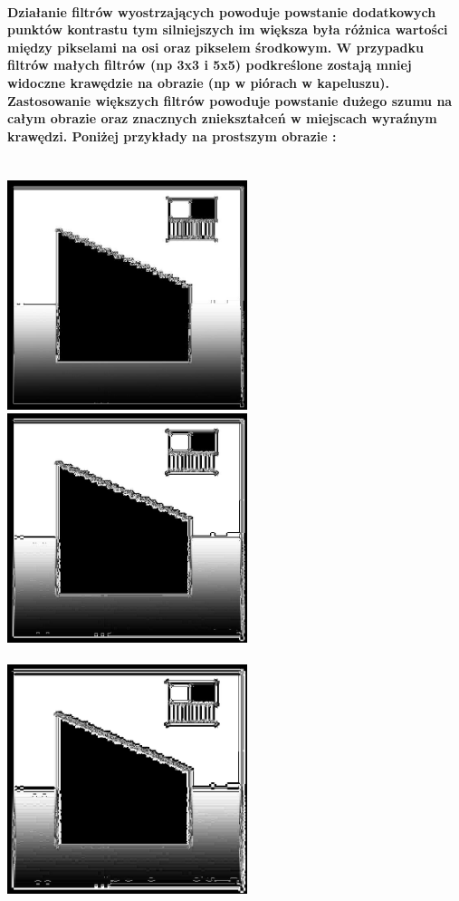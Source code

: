 \documentclass[a4paper,12pt,openany]{report}
\begin{document}
\pagebreak
\paragraph{\indent Działanie filtrów wyostrzających powoduje powstanie dodatkowych punktów kontrastu tym silniejszych im większa była różnica wartości między pikselami na osi oraz pikselem środkowym. W przypadku filtrów małych filtrów (np 3x3 i 5x5) podkreślone zostają mniej widoczne krawędzie na obrazie (np w piórach w kapeluszu). Zastosowanie większych filtrów powoduje powstanie dużego szumu na całym obrazie oraz znacznych zniekształceń w miejscach wyraźnym krawędzi. Poniżej przykłady na prostszym obrazie :}

\begin{center}
\\
\includegraphics[width=7cm]{resources/modified/sample/sample_sharpen_3x3.jpg}
\includegraphics[width=7cm]{resources/modified/sample/sample_sharpen_7x7.jpg}
\\
\\
\includegraphics[width=7cm]{resources/modified/sample/sample_sharpen_11x11.jpg}

\end{center}
\end{document}
